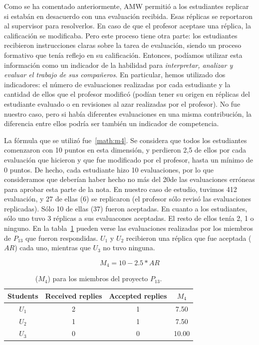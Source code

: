 Como se ha comentado anteriormente, AMW permitió a los estudiantes replicar si estabán en desacuerdo con una evaluación recibida. Esas réplicas se reportaron al supervisor para resolverlos. En caso de que el profesor aceptase una réplica, la calificación se modificaba. Pero este proceso tiene otra parte: los estudiantes recibieron instrucciones claras sobre la tarea de evaluación, siendo un proceso formativo que tenía reflejo en su calificación. Entonces, podíamos utilizar esta información como un indicador de la habilidad para \emph{interpretar, analizar y evaluar el trabajo de sus compañeros}. En particular, hemos utilizado dos indicadores: el número de evaluaciones realizadas por cada estudiante y la cantidad de ellos que el profesor modificó (podían tener su origen en réplicas del estudiante evaluado o en revisiones al azar realizadas por el profesor). No fue nuestro caso, pero si había diferentes evaluaciones en una misma contribución, la diferencia entre ellos podría ser también un indicador de competencia.

La fórmula que se utilizó fue~\ref{math:m4}. Se considera que todos los estudiantes comenzaron con 10 puntos en esta dimensión, y perdieron 2,5 de ellos por cada evaluación que hicieron  y que fue modificado por el profesor, hasta un mínimo de 0 puntos. De hecho, cada estudiante hizo 10 evaluaciones, por lo que consideramos que deberían haber hecho no más del 20\percentage de las evaluaciones erróneas para aprobar esta parte de la nota. En nuestro caso de estudio, tuvimos 412 evaluación, y 27 de ellas (6\percentage) se replicaron (el profesor sólo revisó las evaluaciones replicadas). Sólo 10 de ellas (37\percentage) fueron aceptadas. En cuanto a los estudiantes, sólo uno tuvo 3 réplicas a sus evaluacones aceptadas. El resto de ellos tenía 2, 1 o ninguno. En la tabla~\ref{table:students-grade-replies} pueden verse las evaluaciones realizadas por los miembros de $P_{13}$ que fueron respondidas. $U_1$ y $U_2$ recibieron una réplica que fue aceptada ($AR$) cada uno, mientras que $U_3 $ no tuvo ninguna.

\begin{equation}
    \textbf{$M_4 = 10 - 2.5 * AR$}
    \label{math:m4}
\end{equation}

\begin{table}[h]
\centering
\begin{tabular}{|c|c|c|c|}
\hline
\textbf{Students} & \textbf{Received replies} & \textbf{Accepted replies} & \textbf{$M_4$}  \\ \hline
\hline
 $U_1$ & 2 & 1 & 7.50  \\ \hline
 $U_2$ & 1 & 1 & 7.50 \\ \hline
 $U_3$ & 0 & 0 & 10.00  \\ \hline
\end{tabular}
\caption{($M_4$) para los miembros del proyecto $P_{13}$.}
\label{table:students-grade-replies}
\end{table}

